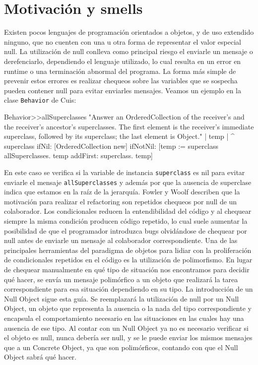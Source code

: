 \section{Motivación y smells}

Existen pocos lenguajes de programación orientados a objetos, y de uso extendido ninguno, que no
cuenten con una u otra forma de representar el valor especial null. La utilización de null conlleva
como principal riesgo el enviarle un mensaje o derefenciarlo, dependiendo el lenguaje utilizado, lo
cual resulta en un error en runtime o una terminación abnormal del programa. La forma más simple de
prevenir estos errores es realizar chequeos sobre las variables que se sospecha pueden contener null
para evitar enviarles mensajes. Veamos un ejemplo en la clase \lstinline{Behavior} de Cuis:

\begin{code}
Behavior>>allSuperclasses
	"Answer an OrderedCollection of the receiver's and the receiver's  
	ancestor's superclasses. The first element is the receiver's immediate  
	superclass, followed by its superclass; the last element is Object."
	| temp |
	^ superclass
		ifNil: [OrderedCollection new]
		ifNotNil: [temp := superclass allSuperclasses.
			temp addFirst: superclass.
            temp]
\end{code}

En este caso se verifica si la variable de instancia \lstinline{superclass} es nil para evitar
enviarle el mensaje \lstinline{allSuperclasses} y además por que la ausencia de superclase indica
que estamos en la raíz de la jerarquía.
Fowler y Woolf describen que la motivación para realizar el refactoring son repetidos chequeos por
null de un colaborador. Los condicionales reducen la entendibilidad del código y al chequear siempre
la misma condición producen código repetido, lo cual suele aumentar la posibilidad de que el
programador introduzca bugs olvidándose de chequear por null antes de enviarle un mensaje al
colaborador correspondiente. Una de las principales herramientas del paradigma de objetos para
lidiar con la proliferación de condicionales repetidos en el código es la utilización de
polimorfismo. En lugar de chequear manualmente en qué tipo de situación nos encontramos para decidir
qué hacer, se envía un mensaje polimórfico a un objeto que realizará la tarea correspondiente para
esa situación dependiendo en su tipo. La introducción de un Null Object sigue esta guía. Se
reemplazará la utilización de null por un Null Object, un objeto que representa la ausencia o la
nada del tipo correspondiente y encapsula el comportamiento necesario en las situaciones en las
cuales hay una ausencia de ese tipo. Al contar con un Null Object ya no es necesario verificar si el
objeto es null, nunca debería ser null, y se le puede enviar los mismos mensajes que a un Concrete
Object, ya que son polimórficos, contando con que el Null Object sabrá qué hacer.


